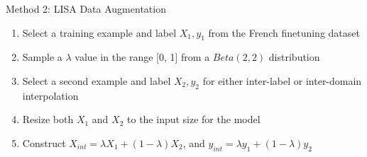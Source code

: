 \documentclass[final]{beamer}
\newlength{\colwidth}
\begin{document}
\begin{frame}[t]
\begin{columns}[t]
\begin{column}{\colwidth}
\begin{block}{Method 2: LISA Data Augmentation}
\begin{enumerate}
\item Select a training example and label $X_1 , y_1$ from the French finetuning dataset
\item Sample a $\lambda$ value in the range [0, 1] from a $Beta(2,2)$ distribution
\item Select a second example and label $X_2, y_2$ for either inter-label or inter-domain interpolation
\item Resize both $X_1$ and $X_2$ to the input size for the model
\item Construct $X_{int} = \lambda X_1 + (1 - \lambda)X_2$, and  $y_{int} = \lambda y_1 + (1 - \lambda)y_2$
\end{enumerate}

\end{block}


\end{column}
\end{columns}
\end{frame}
\end{document}
